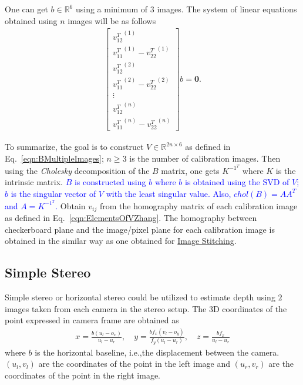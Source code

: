 \documentclass{report}
\renewcommand{\Re}{\mathbb{R}}
\begin{document}
One can get $b \in\Re^{6}$ using a minimum of $3$ images. The system of linear equations obtained using $n$ images will be as follows
\begin{align}
	\begin{bmatrix}
		{v^{T}_{12}}^{(1)} \\[5pt]
		{v^{T}_{11}}^{(1)} - {v^{T}_{22}}^{(1)} \\[5pt]
		{v^{T}_{12}}^{(2)} \\[5pt]
		{v^{T}_{11}}^{(2)} - {v^{T}_{22}}^{(2)} \\[5pt]
		\vdots \\[5pt]
		{v^{T}_{12}}^{(n)} \\[5pt]
		{v^{T}_{11}}^{(n)} - {v^{T}_{22}}^{(n)}
	\end{bmatrix}
	b = \mathbf{0}.
	\label{eqn:BMultipleImages}
\end{align}

To summarize, the goal is to construct $V \in\Re^{2n \times 6}$ as defined in Eq.~\ref{eqn:BMultipleImages}; $n \geq 3$ is the number of calibration images. Then using the \textit{Cholesky} decomposition of the $B$ matrix, one gets $K^{-1^T}$ where $K$ is the intrinsic matrix. \textcolor{blue}{$B$ is constructed using $b$ where $b$ is obtained using the SVD of $V$; $b$ is the singular vector of $V$ with the least singular value. Also, $chol(B) = A A^{T}$ and $A = K^{-1^T}$.} Obtain $v_{ij}$ from the homography matrix of each calibration image as defined in Eq.~\ref{eqn:ElementsOfVZhang}. The homography between checkerboard plane and the image/pixel plane for each calibration image is obtained in the similar way as one obtained for \hyperref[section:ImageStitching]{Image Stitching}.


\subsection{Simple Stereo}
\hspace{\parindent}Simple stereo or horizontal stereo could be utilized to estimate depth using $2$ images taken from each camera in the stereo setup. The $3$D coordinates of the point expressed in camera frame are obtained as
\begin{align}
	x =\frac{b (u_l - o_x)}{u_l - u_r}, \quad y = \frac{b f_x (v_l - o_y)}{f_y (u_l - u_r)}, \quad z = \frac{b f_x}{u_l - u_r}
\end{align}
where $b$ is the horizontal baseline, i.e.,the displacement between the camera. $(u_l, v_l)$ are the coordinates of the point in the left image and $(u_r, v_r)$ are the coordinates of the point in the right image.
\end{document}
